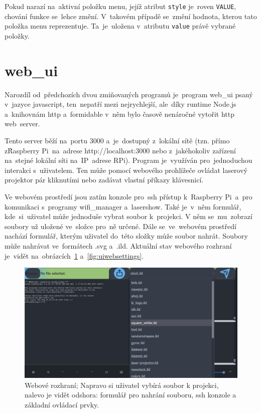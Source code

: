 Pokud narazí na~aktivní položku menu, jejíž atribut \texttt{style} je~roven \texttt{VALUE}, chování funkce se~lehce změní. V~takovém případě se~změní hodnota, kterou tato položka menu reprezentuje. Ta~je~uložena v~atributu \texttt{value} právě vybrané položky.

\section{web\_ui}

Narozdíl od~předchozích dvou zmiňovaných programů je~program web\_ui psaný v~jazyce javascript, ten~nepatří mezi nejrychlejší, ale~díky runtime Node.js a~knihovnám http a~formidable v~něm bylo časově nenáročné vytořit http web~server.

Tento server běží na~portu 3000 a~je~dostupný z~lokální sítě (tzn. přímo z\~Raspberry Pi~na~adrese http://localhost:3000 nebo z~jakéhokoliv zařízení na~stejné lokální síti na~IP~adrese RPi).
Program je~využíván pro~jednoduchou interakci s~uživatelem.
Ten může pomocí webového prohlížeče ovládat laserový projektor pár kliknutími nebo zadávat vlastní příkazy klávesnicí.

Ve webovém prostředí jsou zatím konzole pro~ssh přístup k~Raspberry Pi~a~pro komunikaci s~programy wifi\_manager a~lasershow.
Také je~v~něm formulář, kde~si~uživatel může jednoduše vybrat soubor k~projekci.
V něm se~mu~zobrazí soubory už uložené ve~složce pro~ně určené. Dále se~ve~webovém prostředí nachází formulář, kterým uživatel do~této složky může soubor nahrát. Soubory může nahrávat ve~formátech .svg a~.ild.
Aktuální stav webového rozhraní je~vidět na~obrázcích~\ref{fig:uisshfile} a~\ref{fig:uiwebsettings}.

\begin{figure}[ht]
    \centering
    \includegraphics[width=1\textwidth]{img/ui_ssh-file.jpg}
    \caption{\label{fig:uisshfile} Webové rozhraní; Napravo si uživatel vybírá soubor k projekci, nalevo je vidět odshora: formulář pro nahrání souboru, ssh konzole a základní ovládací prvky.}
\end{figure}

